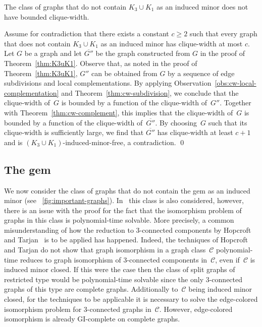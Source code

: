 \documentclass[envcountsame,envcountsect,11pt,a4paper]{llncs}
\renewenvironment{proof}{\begin{Proof}}{\qed\end{Proof}}
\newcommand{\figref}[1]{\figurename~\ref{#1}}
\begin{document}
\begin{theorem}
The class of graphs that do not contain $K_3 \cup K_1$ as an induced minor does not have bounded clique-width.
\end{theorem}
\begin{proof}
Assume for contradiction that there exists a constant $c \geq 2$ such that every graph that does not contain $K_3 \cup K_1$ as an induced
minor has clique-width at most $c$.
Let $G$ be a graph and let $\overline{G''}$ be the graph constructed from $G$ in the proof of Theorem~\ref{thm:K3uK1}. Observe that, as
noted in the proof of Theorem~\ref{thm:K3uK1}, $G''$ can be obtained from $G$ by a sequence of edge subdivisions and local
complementations. By applying Observation~\ref{obs:cw-local-complementation} and Theorem~\ref{thm:cw-subdivision}, we conclude that the
clique-width of~$G$ is bounded by a function of the clique-width of~${G''}$. Together with Theorem~\ref{thm:cw-complement}, this implies that
the clique-width of~$G$ is bounded by a function of the clique-width of~$\overline{G''}$. By choosing~$G$ such that its clique-width is
sufficiently large, we find that $\overline{G''}$ has clique-width at least $c+1$ and is $(K_3 \cup K_1)$-induced-minor-free, a contradiction.
\end{proof}

\subsection{The gem}\label{subsection:gem}

We now consider the class of graphs that do not contain the gem as an induced minor (see
\figref{fig:important-graphs}). In~\cite{Ponomarenko88} this class is also considered, however, there is an issue with the proof for the
fact that the isomorphism problem of graphs in this class is polynomial-time solvable. More precisely, a common misunderstanding of how the
reduction to 3-connected components by Hopcroft and Tarjan~\cite{DBLP:conf/coco/HopcroftT72} is to be applied has happened.
Indeed, the techniques of Hopcroft and Tarjan do not show that graph
isomorphism in a graph class~$\mathcal{C}$ polynomial-time reduces to
graph isomorphism of 3-connected components in~$\mathcal{C}$, even
if~$\mathcal{C}$ is induced minor closed. If this were the case
then the class of split graphs of restricted type would be
polynomial-time solvable since the only 3-connected graphs of this type
are complete graphs. Additionally to~$\mathcal{C}$ being induced minor closed,
for the techniques to be applicable it is necessary to solve the
edge-colored isomorphism problem for 3-connected graphs
in~$\mathcal{C}$.  However, edge-colored isomorphism is already
GI-complete on complete graphs.
\end{document}
